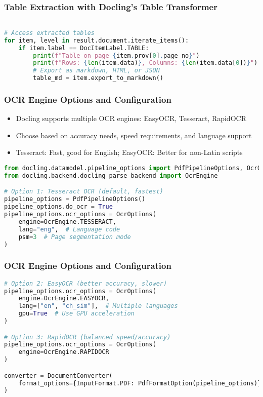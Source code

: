 \begin{frame}[fragile]\frametitle{Table Extraction with Docling's Table Transformer}

      
\begin{lstlisting}[language=Python, basicstyle=\tiny, basicstyle=\tiny]

# Access extracted tables
for item, level in result.document.iterate_items():
    if item.label == DocItemLabel.TABLE:
        print(f"Table on page {item.prov[0].page_no}")
        print(f"Rows: {len(item.data)}, Columns: {len(item.data[0])}")
        # Export as markdown, HTML, or JSON
        table_md = item.export_to_markdown()
\end{lstlisting}
\end{frame}

\begin{frame}[fragile]\frametitle{OCR Engine Options and Configuration}
      \begin{itemize}
          \item Docling supports multiple OCR engines: EasyOCR, Tesseract, RapidOCR
          \item Choose based on accuracy needs, speed requirements, and language support
          \item Tesseract: Fast, good for English; EasyOCR: Better for non-Latin scripts
      \end{itemize}
      
\begin{lstlisting}[language=Python, basicstyle=\tiny]
from docling.datamodel.pipeline_options import PdfPipelineOptions, OcrOptions
from docling.backend.docling_parse_backend import OcrEngine

# Option 1: Tesseract OCR (default, fastest)
pipeline_options = PdfPipelineOptions()
pipeline_options.do_ocr = True
pipeline_options.ocr_options = OcrOptions(
    engine=OcrEngine.TESSERACT,
    lang="eng",  # Language code
    psm=3  # Page segmentation mode
)
\end{lstlisting}
\end{frame}


\begin{frame}[fragile]\frametitle{OCR Engine Options and Configuration}

\begin{lstlisting}[language=Python, basicstyle=\tiny]
# Option 2: EasyOCR (better accuracy, slower)
pipeline_options.ocr_options = OcrOptions(
    engine=OcrEngine.EASYOCR,
    lang=["en", "ch_sim"],  # Multiple languages
    gpu=True  # Use GPU acceleration
)

# Option 3: RapidOCR (balanced speed/accuracy)
pipeline_options.ocr_options = OcrOptions(
    engine=OcrEngine.RAPIDOCR
)

converter = DocumentConverter(
    format_options={InputFormat.PDF: PdfFormatOption(pipeline_options)}
)
\end{lstlisting}
\end{frame}

